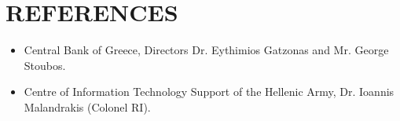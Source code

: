 \documentclass[11pt,a4paper,roman]{moderncv}
\begin{document}
{\section{REFERENCES}
\begin{minipage}{\maincolumnwidth}%
	\small{
    	\begin{itemize}
          \item Central Bank of Greece, Directors Dr. Eythimios Gatzonas and Mr. George Stoubos.
          \item Centre of Information Technology Support of the Hellenic Army, Dr. Ioannis Malandrakis (Colonel RI).
		\end{itemize}}%
\end{minipage}%
      
}
\nocite{*}



\end{document}
